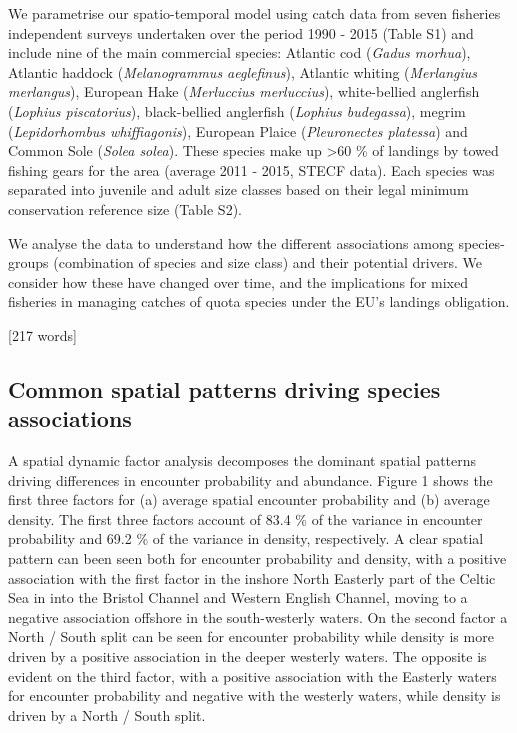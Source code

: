 \documentclass{nature}
\begin{document}
\begin{linenumbers}
We parametrise our spatio-temporal model using catch data from seven fisheries
independent surveys undertaken over the period 1990 - 2015 (Table S1) and
include nine of the main commercial species: Atlantic cod (\textit{Gadus
	morhua}), Atlantic haddock (\textit{Melanogrammus aeglefinus}),
Atlantic whiting (\textit{Merlangius merlangus}), European Hake
(\textit{Merluccius merluccius}), white-bellied anglerfish (\textit{Lophius
	piscatorius}), black-bellied anglerfish (\textit{Lophius budegassa}),
megrim (\textit{Lepidorhombus whiffiagonis}), European Plaice
(\textit{Pleuronectes platessa}) and Common Sole (\textit{Solea solea}). These
species make up \textgreater 60 \% of landings by towed fishing gears for the
area (average 2011 - 2015, STECF data). Each species was separated into
juvenile and adult size classes based on their legal minimum conservation
reference size (Table S2).

We analyse the data to understand how the different associations among
species-groups (combination of species and size class) and their potential
drivers. We consider how these have changed over time, and the implications for
mixed fisheries in managing catches of quota species under the EU's landings
obligation.

[217 words]

\subsection{Common spatial patterns driving species associations}
A spatial dynamic factor analysis decomposes the dominant spatial patterns
driving differences in encounter probability and abundance. Figure 1 shows the
first three factors for (a) average spatial encounter probability and (b)
average density. The first three factors account of 83.4 \% of the variance in
encounter probability and 69.2 \% of the variance in density, respectively. A
clear spatial pattern can been seen both for encounter probability and density,
with a positive association with the first factor in the inshore North Easterly
part of the Celtic Sea in into the Bristol Channel and Western English Channel,
moving to a negative association offshore in the south-westerly waters. On the
second factor a North / South split can be seen for encounter probability while
density is more driven by a positive association in the deeper westerly waters.
The opposite is evident on the third factor, with a positive association with
the Easterly waters for encounter probability and negative with the westerly
waters, while density is driven by a North / South split.


\end{linenumbers}
\end{document}
